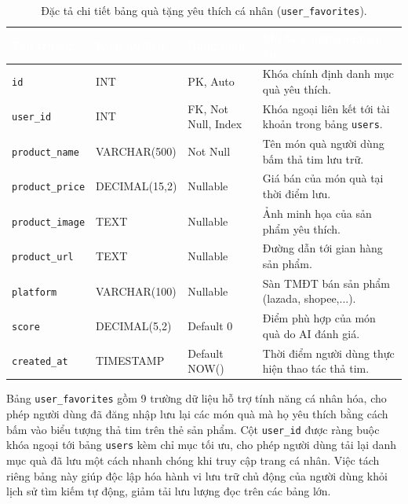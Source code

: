 \begin{table}[htbp]
\centering
\caption{Đặc tả chi tiết bảng quà tặng yêu thích cá nhân (\texttt{user\_favorites}).}
\label{tab:db_favorites}
\small
\renewcommand{\arraystretch}{1.25}
\begin{tabularx}{\textwidth}{|p{3.0cm}|p{2.6cm}|p{2.8cm}|X|}
\hline
\rowcolor{PrimaryBlue}
\textcolor{white}{\textbf{Tên trường}} &
\textcolor{white}{\textbf{Kiểu dữ liệu}} &
\textcolor{white}{\textbf{Ràng buộc}} &
\textcolor{white}{\textbf{Mô tả ý nghĩa nghiệp vụ}} \\
\hline
\texttt{id} & INT & PK, Auto & Khóa chính định danh mục quà yêu thích. \\
\hline
\texttt{user\_id} & INT & FK, Not Null, Index & Khóa ngoại liên kết tới tài khoản trong bảng \texttt{users}. \\
\hline
\texttt{product\_name} & VARCHAR(500) & Not Null & Tên món quà người dùng bấm thả tim lưu trữ. \\
\hline
\texttt{product\_price} & DECIMAL(15,2) & Nullable & Giá bán của món quà tại thời điểm lưu. \\
\hline
\texttt{product\_image} & TEXT & Nullable & Ảnh minh họa của sản phẩm yêu thích. \\
\hline
\texttt{product\_url} & TEXT & Nullable & Đường dẫn tới gian hàng sản phẩm. \\
\hline
\texttt{platform} & VARCHAR(100) & Nullable & Sàn TMĐT bán sản phẩm (lazada, shopee,...). \\
\hline
\texttt{score} & DECIMAL(5,2) & Default 0 & Điểm phù hợp của món quà do AI đánh giá. \\
\hline
\texttt{created\_at} & TIMESTAMP & Default NOW() & Thời điểm người dùng thực hiện thao tác thả tim. \\
\hline
\end{tabularx}
\end{table}

Bảng \texttt{user\_favorites} gồm 9 trường dữ liệu hỗ trợ tính năng cá nhân hóa, cho phép người dùng đã đăng nhập lưu lại các món quà mà họ yêu thích bằng cách bấm vào biểu tượng thả tim trên thẻ sản phẩm. Cột \texttt{user\_id} được ràng buộc khóa ngoại tới bảng \texttt{users} kèm chỉ mục tối ưu, cho phép người dùng tải lại danh mục quà đã lưu một cách nhanh chóng khi truy cập trang cá nhân. Việc tách riêng bảng này giúp độc lập hóa hành vi lưu trữ chủ động của người dùng khỏi lịch sử tìm kiếm tự động, giảm tải lưu lượng đọc trên các bảng lớn.

